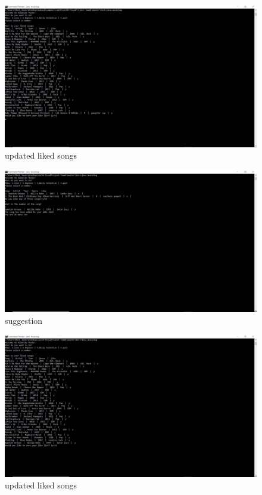\documentclass[]{article}
\begin{document}
\begin{figure}
\centering
\includegraphics{../images/updated.png}
\caption{updated liked songs}
\end{figure}

\begin{figure}
\centering
\includegraphics{../images/suggestion.PNG}
\caption{suggestion}
\end{figure}

\begin{figure}
\centering
\includegraphics{../images/new.png}
\caption{updated liked songs}
\end{figure}
\end{document}

